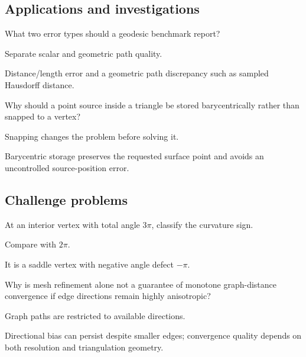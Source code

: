 \subsection*{Applications and investigations}

\begin{exercise}\label{exr:vii38-ped-13}
What two error types should a geodesic benchmark report?
\end{exercise}

\begin{hint}
Separate scalar and geometric path quality.
\end{hint}

\begin{solution}
Distance/length error and a geometric path discrepancy such as sampled Hausdorff distance.
\end{solution}

\begin{exercise}\label{exr:vii38-ped-14}
Why should a point source inside a triangle be stored barycentrically rather than snapped to a vertex?
\end{exercise}

\begin{hint}
Snapping changes the problem before solving it.
\end{hint}

\begin{solution}
Barycentric storage preserves the requested surface point and avoids an uncontrolled source-position error.
\end{solution}

\subsection*{Challenge problems}

\begin{exercise}\label{exr:vii38-ped-15}
At an interior vertex with total angle \(3\pi\), classify the curvature sign.
\end{exercise}

\begin{hint}
Compare with \(2\pi\).
\end{hint}

\begin{solution}
It is a saddle vertex with negative angle defect \(-\pi\).
\end{solution}

\begin{exercise}\label{exr:vii38-ped-16}
Why is mesh refinement alone not a guarantee of monotone graph-distance convergence if edge directions remain highly anisotropic?
\end{exercise}

\begin{hint}
Graph paths are restricted to available directions.
\end{hint}

\begin{solution}
Directional bias can persist despite smaller edges; convergence quality depends on both resolution and triangulation geometry.
\end{solution}

